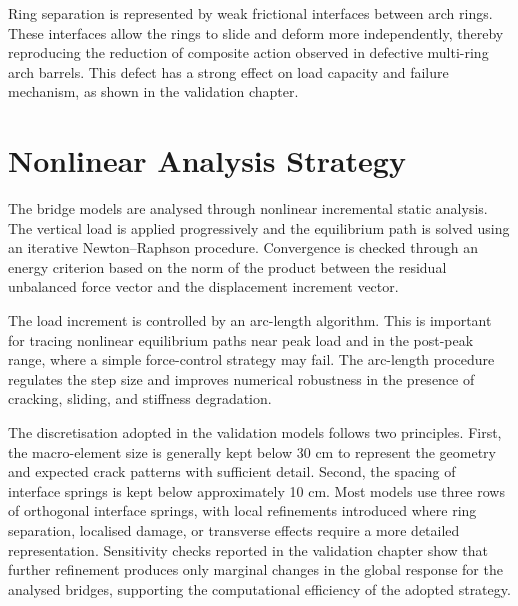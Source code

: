 Ring separation is represented by weak frictional interfaces between arch rings. These interfaces allow the rings to slide and deform more independently, thereby reproducing the reduction of composite action observed in defective multi-ring arch barrels. This defect has a strong effect on load capacity and failure mechanism, as shown in the validation chapter.

\section{Nonlinear Analysis Strategy}
\label{sec:dmem-analysis-strategy}

The bridge models are analysed through nonlinear incremental static analysis. The vertical load is applied progressively and the equilibrium path is solved using an iterative Newton--Raphson procedure. Convergence is checked through an energy criterion based on the norm of the product between the residual unbalanced force vector and the displacement increment vector.

The load increment is controlled by an arc-length algorithm. This is important for tracing nonlinear equilibrium paths near peak load and in the post-peak range, where a simple force-control strategy may fail. The arc-length procedure regulates the step size and improves numerical robustness in the presence of cracking, sliding, and stiffness degradation.

The discretisation adopted in the validation models follows two principles. First, the macro-element size is generally kept below 30 cm to represent the geometry and expected crack patterns with sufficient detail. Second, the spacing of interface springs is kept below approximately 10 cm. Most models use three rows of orthogonal interface springs, with local refinements introduced where ring separation, localised damage, or transverse effects require a more detailed representation. Sensitivity checks reported in the validation chapter show that further refinement produces only marginal changes in the global response for the analysed bridges, supporting the computational efficiency of the adopted strategy.


